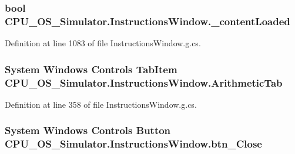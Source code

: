 \subsubsection[{\+\_\+content\+Loaded}]{\setlength{\rightskip}{0pt plus 5cm}bool C\+P\+U\+\_\+\+O\+S\+\_\+\+Simulator.\+Instructions\+Window.\+\_\+content\+Loaded\hspace{0.3cm}{\ttfamily [private]}}\label{class_c_p_u___o_s___simulator_1_1_instructions_window_a7755282dffea134038e9e58c931dc297}


Definition at line 1083 of file Instructions\+Window.\+g.\+cs.

\hypertarget{class_c_p_u___o_s___simulator_1_1_instructions_window_aabf61d7cbf8be85bb4ab0ef2d0614b46}{}
\subsubsection[{Arithmetic\+Tab}]{\setlength{\rightskip}{0pt plus 5cm}System Windows Controls Tab\+Item C\+P\+U\+\_\+\+O\+S\+\_\+\+Simulator.\+Instructions\+Window.\+Arithmetic\+Tab\hspace{0.3cm}{\ttfamily [package]}}\label{class_c_p_u___o_s___simulator_1_1_instructions_window_aabf61d7cbf8be85bb4ab0ef2d0614b46}


Definition at line 358 of file Instructions\+Window.\+g.\+cs.

\hypertarget{class_c_p_u___o_s___simulator_1_1_instructions_window_a06305ca0735ae2d93a331fb33d2fe88f}{}
\subsubsection[{btn\+\_\+\+Close}]{\setlength{\rightskip}{0pt plus 5cm}System Windows Controls Button C\+P\+U\+\_\+\+O\+S\+\_\+\+Simulator.\+Instructions\+Window.\+btn\+\_\+\+Close\hspace{0.3cm}{\ttfamily [package]}}\label{class_c_p_u___o_s___simulator_1_1_instructions_window_a06305ca0735ae2d93a331fb33d2fe88f}


